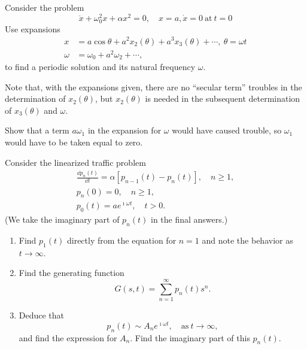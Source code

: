 \begin{Exercise}
  Consider the problem
  \[ 
  \ddot{x} +\omega_0^2 x+\alpha x^2=0, \quad x=a, \dot{x}=0\ \mathrm{at}\ t=0
  \]
  Use expansions
  \begin{align*}
    x&=a\cos\theta+a^2 x_2(\theta)+a^3x_3(\theta)+\cdots,\ \theta=\omega t \\
    \omega &=\omega_0+a^2\omega_2+\cdots,
  \end{align*}
  to find a periodic solution and its natural frequency $\omega$.

  Note that, with the expansions given, there are no ``secular term'' troubles
  in the determination of $x_2(\theta)$, but $x_2(\theta)$ is needed in the
  subsequent determination of $x_3(\theta)$ and $\omega$.

  Show that a term $a\omega_1$ in the expansion for $\omega$ would have 
  caused trouble, so $\omega_1$ would have to be taken equal to zero.
\end{Exercise}





\begin{Exercise}
  Consider the linearized traffic problem
  \begin{gather*}
    \frac{\dd p_n(t)}{\dd t} = \alpha \left[ p_{n-1}(t) - p_n(t)\right], \quad n \geq 1,\\
    p_n(0) = 0, \quad n \geq 1, \\
    p_0(t) = a e^{\imath \omega t}, \quad t > 0.
  \end{gather*}
  (We take the imaginary part of $p_n(t)$ in the final answers.)
  \begin{enumerate}
  \item
    Find $p_1(t)$ directly from the equation for $n=1$ and note the behavior as
    $t \to \infty$.
  \item
    Find the generating function
    \[ G(s,t) = \sum_{n = 1}^\infty p_n(t) s^n. \]
  \item
    Deduce that 
    \[ p_n(t) \sim A_n e^{\imath \omega t}, \quad \mathrm{as}\ t \to \infty, \]
    and find the expression for $A_n$.  Find the imaginary part of this $p_n(t)$.
  \end{enumerate}
\end{Exercise}



